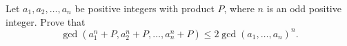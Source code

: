 Let $a_1,a_2,\dots, a_n$ be positive integers with product $P$, where $n$ is an odd positive integer. Prove that \[\gcd(a_1^n+P,a_2^n+P,\dots, a_n^n+P)\le 2\gcd(a_1,\dots, a_n)^n.\]